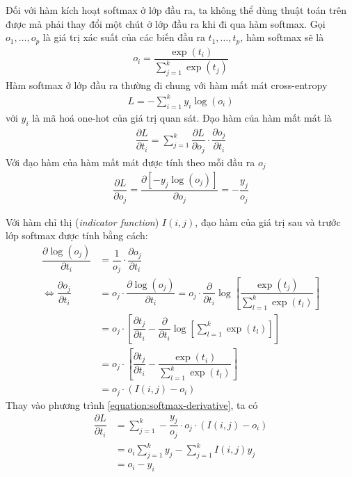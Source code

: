 Đối với hàm kích hoạt softmax ở lớp đầu ra, ta không thể dùng thuật toán trên được mà phải thay đổi một chút ở lớp đầu ra khi đi qua hàm softmax. Gọi $o_1,\dots,o_p$ là giá trị xác suất của các biến đầu ra $t_1,\dots,t_p$, hàm softmax sẽ là
\begin{align}
    o_i=\dfrac{\exp(t_i)}{\sum_{j=1}^k\exp(t_j)}
\end{align}
Hàm softmax ở lớp đầu ra thường đi chung với hàm mất mát cross-entropy
\begin{align}
    L=-\sum_{i=1}^k y_i\log(o_i)
\end{align}
với $y_i$ là mã hoá one-hot của giá trị quan sát. Đạo hàm của hàm mất mát là
\begin{align}
    \label{equation:softmax-derivative}
    \dfrac{\partial L}{\partial t_i}
    =\sum_{j=1}^k\dfrac{\partial L}{\partial o_j}\cdot\dfrac{\partial o_j}{\partial t_i}
\end{align}
Với đạo hàm của hàm mất mát được tính theo mỗi đầu ra $o_j$
\begin{align}
    \dfrac{\partial L}{\partial o_j}=\dfrac{\partial[-y_j\log(o_j)]}{\partial o_j}=-\dfrac{y_j}{o_j}
\end{align}

Với hàm chỉ thị (\textit{indicator function}) $I(i,j)$, đạo hàm của giá trị sau và trước lớp softmax được tính bằng cách: \cite{webpage3}
\begin{align}
    \dfrac{\partial\log(o_j)}{\partial t_i}           & =\dfrac{1}{o_j}\cdot\dfrac{\partial o_j}{\partial t_i}                                                                                  \\
    \Leftrightarrow\dfrac{\partial o_j}{\partial t_i} & =o_j\cdot\dfrac{\partial\log(o_j)}{\partial t_i}
    =o_j\cdot\dfrac{\partial}{\partial t_i}\log\left[\dfrac{\exp(t_j)}{\sum_{l=1}^k\exp(t_l)}\right]                                                                                  \nonumber \\
                                                      & =o_j\cdot\left[\dfrac{\partial t_j}{\partial t_i}-\dfrac{\partial}{\partial t_i}\log\left[\sum_{l=1}^k\exp(t_l)\right]\right] \nonumber \\
                                                      & =o_j\cdot\left[\dfrac{\partial t_j}{\partial t_i}-\dfrac{\exp(t_i)}{\sum_{l=1}^k\exp(t_l)}\right]                             \nonumber \\
                                                      & =o_j\cdot(I(i,j)-o_i)
\end{align}
Thay vào phương trình \ref{equation:softmax-derivative}, ta có
\begin{align}
    \dfrac{\partial L}{\partial t_i}
     & =\sum_{j=1}^k-\dfrac{y_j}{o_j}\cdot o_j\cdot(I(i,j)-o_i) \nonumber \\
     & =o_i\sum_{j=1}^k y_j-\sum_{j=1}^k I(i,j)y_j              \nonumber \\
     & =o_i-y_i
\end{align}

